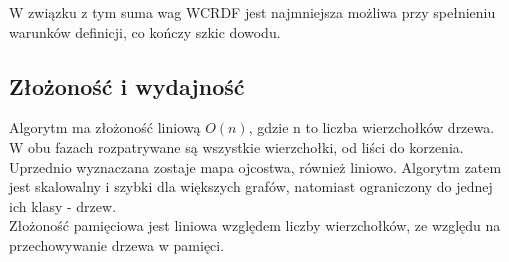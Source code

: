W związku z tym suma wag WCRDF jest najmniejsza możliwa przy spełnieniu warunków definicji, co kończy szkic dowodu.

\subsection{Złożoność i wydajność}
Algorytm ma złożoność liniową $O(n)$, gdzie n to liczba wierzchołków drzewa. W obu fazach rozpatrywane są wszystkie wierzchołki, od liści do korzenia. Uprzednio wyznaczana zostaje mapa ojcostwa, również liniowo. Algorytm zatem jest skalowalny i szybki dla większych grafów, natomiast ograniczony do jednej ich klasy - drzew.\\ Złożoność pamięciowa jest liniowa względem liczby wierzchołków, ze względu na przechowywanie drzewa w pamięci.

